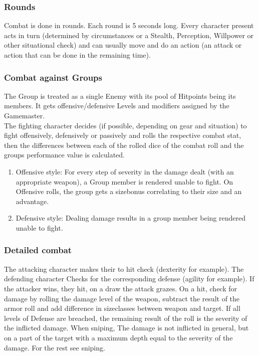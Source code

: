 \documentclass{article}
\begin{document}
    \subsubsection{Rounds}
    Combat is done in rounds. Each round is 5 seconds long. Every character present acts in turn (determined
    by circumstances or a Stealth, Perception, Willpower or other situational check) and can usually move and do an action
    (an attack or action that can be done in the remaining time).

    \subsubsection{Combat against Groups}
    The Group is treated as a single Enemy with its pool of Hitpoints being its members.
    It gets offensive/defensive Levels and modifiers assigned by the Gamemaster.\\

    The fighting character decides (if possible, depending on gear and situation) to fight offensively, defensively
    or passively and rolls the respective combat stat, then the differences between each of the rolled dice of the combat
    roll and the groups performance value is calculated.\par
    \begin{enumerate}[label= - ]

        \item Offensive style: For every step of severity in the damage dealt (with an appropriate weapon),
        a Group member is rendered unable to
        fight. On Offensive rolls, the group gets a sizebonus correlating to their size and an advantage.\\

        \item Defensive style: Dealing damage results in a group member being rendered unable to fight.\\
    \end{enumerate}

    \subsubsection{Detailed combat}
    The attacking character makes their to hit check (dexterity for example). The defending character Checks for the
    corresponding defense (agility for example). If the attacker wins, they hit, on a draw the
    attack grazes. On a hit, check for damage by rolling the damage level of the weapon, subtract the result of the
    armor roll and add difference in sizeclasses between weapon and target.
    If all levels of Defense are breached, the remaining result of the roll is the severity of the inflicted damage.\newline
    When sniping, The damage is not inflicted in general, but on a part of the target with a maximum depth equal to
    the severity of the damage. For the rest see sniping.
\end{document}
